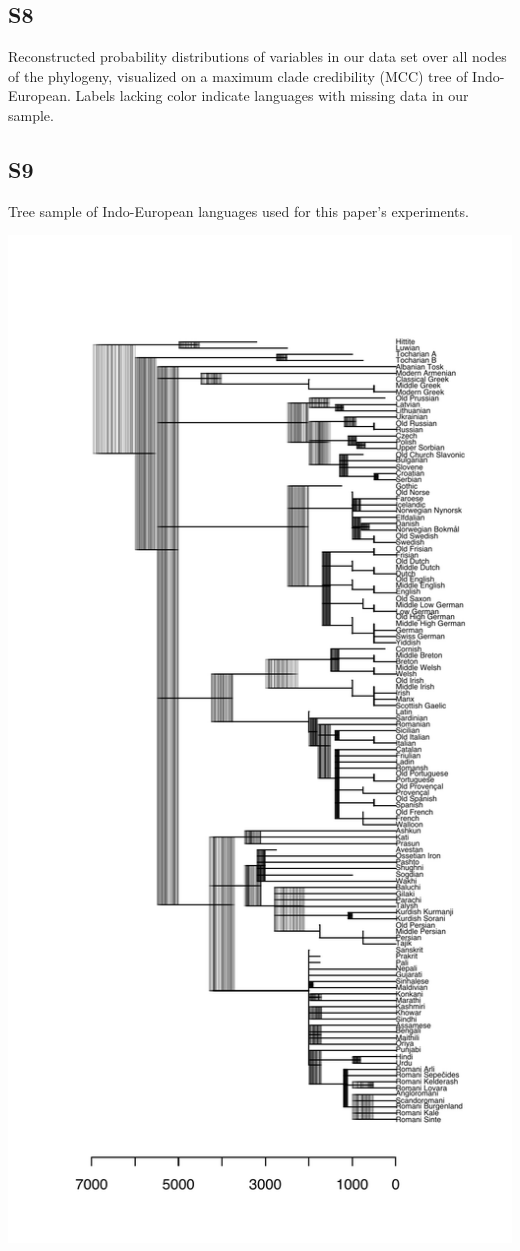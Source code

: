 \documentclass[12pt]{article}
\begin{document}
\subsection*{S8}

Reconstructed probability distributions of variables in our data set over all nodes of the phylogeny, visualized on a maximum clade credibility (MCC) tree of Indo-European. Labels lacking color indicate languages with missing data in our sample.




\subsection*{S9}

Tree sample of Indo-European languages used for this paper's experiments.

\includegraphics[width=.6\linewidth]{tree-sample.pdf}
\end{document}
